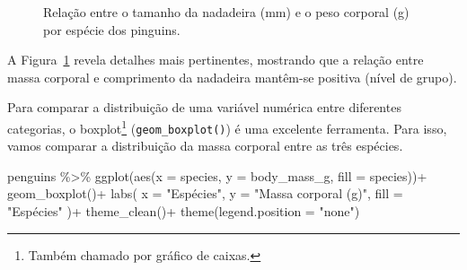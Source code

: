 \documentclass[
  12pt,
  letterpaper,
  DIV=11,
  numbers=noendperiod]{scrreprt}
\newenvironment{Shaded}{\begin{snugshade}}{\end{snugshade}}
\newcommand{\AttributeTok}[1]{\textcolor[rgb]{0.40,0.45,0.13}{#1}}
\newcommand{\FunctionTok}[1]{\textcolor[rgb]{0.28,0.35,0.67}{#1}}
\newcommand{\NormalTok}[1]{\textcolor[rgb]{0.00,0.23,0.31}{#1}}
\newcommand{\SpecialCharTok}[1]{\textcolor[rgb]{0.37,0.37,0.37}{#1}}
\newcommand{\StringTok}[1]{\textcolor[rgb]{0.13,0.47,0.30}{#1}}
\theoremstyle{definition}
\theoremstyle{exemplo}
\begin{document}
\begin{figure}[H]


\caption{\label{fig-dis-esp}Relação entre o tamanho da nadadeira (mm) e
o peso corporal (g) por espécie dos pinguins.}

\end{figure}%

\noindent A Figura~\ref{fig-dis-esp} revela detalhes mais pertinentes,
mostrando que a relação entre massa corporal e comprimento da nadadeira
mantêm-se positiva (nível de grupo).

Para comparar a distribuição de uma variável numérica entre diferentes
categorias, o boxplot\footnote{Também chamado por gráfico de caixas.}
(\texttt{geom\_boxplot()}) é uma excelente ferramenta. Para isso, vamos
comparar a distribuição da massa corporal entre as três espécies.

\begin{Shaded}
\begin{Highlighting}[]
\NormalTok{penguins }\SpecialCharTok{\%\textgreater{}\%} 
  \FunctionTok{ggplot}\NormalTok{(}\FunctionTok{aes}\NormalTok{(}\AttributeTok{x =}\NormalTok{ species, }\AttributeTok{y =}\NormalTok{ body\_mass\_g, }\AttributeTok{fill =}\NormalTok{ species))}\SpecialCharTok{+}
    \FunctionTok{geom\_boxplot}\NormalTok{()}\SpecialCharTok{+}
    \FunctionTok{labs}\NormalTok{(}
      \AttributeTok{x =} \StringTok{"Espécies"}\NormalTok{,}
      \AttributeTok{y =} \StringTok{"Massa corporal (g)"}\NormalTok{,}
      \AttributeTok{fill =} \StringTok{"Espécies"}
\NormalTok{    )}\SpecialCharTok{+}
    \FunctionTok{theme\_clean}\NormalTok{()}\SpecialCharTok{+}
    \FunctionTok{theme}\NormalTok{(}\AttributeTok{legend.position =} \StringTok{"none"}\NormalTok{)}
\end{Highlighting}
\end{Shaded}
\end{document}
